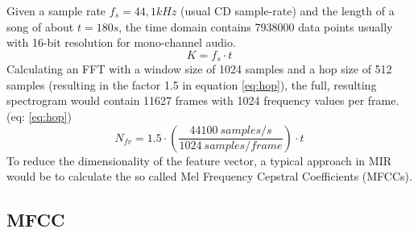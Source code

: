 Given a sample rate $f_s = 44,1kHz$ (usual CD sample-rate) and the length of a song of about $t = 180s$, the time domain contains 7938000 data points usually with 16-bit resolution for mono-channel audio. 
\begin{equation} \label{eq:points}
K = f_s \cdot t
\end{equation}
Calculating an FFT with a window size of 1024 samples and a hop size of 512 samples (resulting in the factor 1.5 in equation \ref{eq:hop})\cite[p. 41]{knees1}, the full, resulting spectrogram would contain 11627 frames with 1024 frequency values per frame. (eq: \ref{eq:hop}) 
\begin{equation} \label{eq:hop}
N_{fv} = 1.5 \cdot (\frac{44100 \ samples/s}{1024 \ samples/frame}) \cdot t
\end{equation}
To reduce the dimensionality of the feature vector, a typical approach in MIR would be to calculate the so called Mel Frequency Cepstral Coefficients (MFCCs).

\subsection{MFCC}\label{mfccsim}

